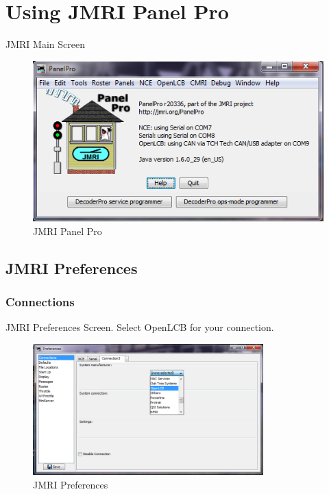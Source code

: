 \documentclass[15pt]{book}
\begin{document}
\chapter{Using JMRI Panel Pro}
JMRI Main Screen
\begin{figure}[htbp]
\begin{center}
\includegraphics[width=6in]{images/jmri.png}
\caption{JMRI Panel Pro}
\end{center}
\end{figure}

\section{JMRI Preferences}
\subsection{Connections}
JMRI Preferences Screen.  Select OpenLCB for your connection.
\begin{figure}[htbp]
\begin{center}
\includegraphics[width=3.5in]{images/jmri_preferences.png}
\caption{JMRI Preferences}
\end{center}
\end{figure}
\end{document}
